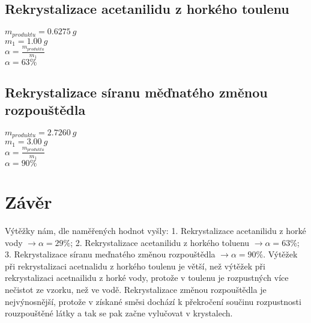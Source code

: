 \documentclass[13pt, a4paper, twoside]{article}
\begin{document}
    \subsection*{Rekrystalizace acetanilidu z horkého toulenu}
    \begin{center}
    \begin{multicols}{2}
        \noindent$m_{produktu}=0.6275\: g$\\
        $m_1=1.00\:g$\\
        $\alpha=\frac{m_{produktu}}{m_1}$\\
        $\alpha=63\%$
    \end{multicols}
    \end{center}
    \subsection*{Rekrystalizace síranu měďnatého změnou rozpouštědla}
    \begin{center}
    \begin{multicols}{2}
        \noindent$m_{produktu}=2.7260\: g$\\
        $m_1=3.00\:g$\\
        $\alpha=\frac{m_{produktu}}{m_1}$\\
        $\alpha=90\%$
    \end{multicols}
    \end{center}

    \section*{Závěr}
    Výtěžky nám, dle naměřených hodnot vyšly: 1. Rekrystalizace acetanilidu z horké vody
    $\to \alpha=29\%$; 2. Rekrystalizace acetanilidu z horkého toluenu $\to \alpha=63\%$;
    3. Rekrystalizace síranu meďnatého změnou rozpouštědla $\to \alpha=90\%$. Výtěžek při rekrystalizaci acetnalidu z horkého toulenu je větší, než
    výtěžek při rekrystalizaci acetnailidu z horké vody, protože v toulenu
    je rozpustných více nečistot ze vzorku, než ve vodě. Rekrystalizace změnou rozpouštědla je nejvýnosnější, protože v získané směsi dochází k překročení součinu rozpustnosti
    rouzpouštěné látky a tak se pak začne vylučovat v krystalech.
\end{document}
